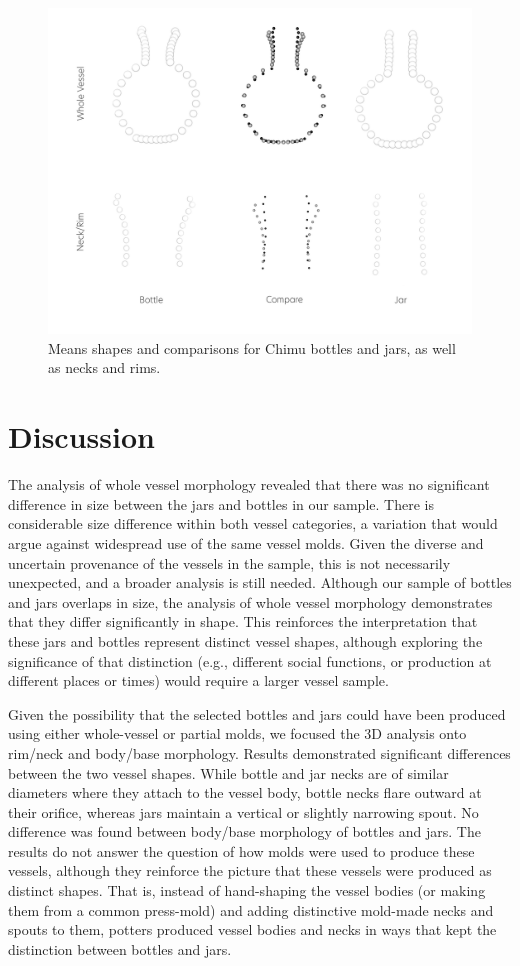 \documentclass[]{interact}
\theoremstyle{plain}%
\theoremstyle{definition}
\theoremstyle{remark}
\begin{document}
\begin{figure}\centering
\includegraphics[width=0.9\linewidth]{figs/mshape.compare.png}
\caption{Means shapes and comparisons for Chimu bottles and jars, as well as necks and rims.}
\label{fig:mshape}
\end{figure}

\hypertarget{discussion}{%
\section{Discussion}\label{discussion}}

The analysis of whole vessel morphology revealed that there was no
significant difference in size between the jars and bottles in our
sample. There is considerable size difference within both vessel
categories, a variation that would argue against widespread use of the
same vessel molds. Given the diverse and uncertain provenance of the
vessels in the sample, this is not necessarily unexpected, and a broader
analysis is still needed. Although our sample of bottles and jars
overlaps in size, the analysis of whole vessel morphology demonstrates
that they differ significantly in shape. This reinforces the
interpretation that these jars and bottles represent distinct vessel
shapes, although exploring the significance of that distinction (e.g.,
different social functions, or production at different places or times)
would require a larger vessel sample.

Given the possibility that the selected bottles and jars could have been
produced using either whole-vessel or partial molds, we focused the 3D
analysis onto rim/neck and body/base morphology. Results demonstrated
significant differences between the two vessel shapes. While bottle and
jar necks are of similar diameters where they attach to the vessel body,
bottle necks flare outward at their orifice, whereas jars maintain a
vertical or slightly narrowing spout. No difference was found between
body/base morphology of bottles and jars. The results do not answer the
question of how molds were used to produce these vessels, although they
reinforce the picture that these vessels were produced as distinct
shapes. That is, instead of hand-shaping the vessel bodies (or making
them from a common press-mold) and adding distinctive mold-made necks
and spouts to them, potters produced vessel bodies and necks in ways
that kept the distinction between bottles and jars.
\end{document}
